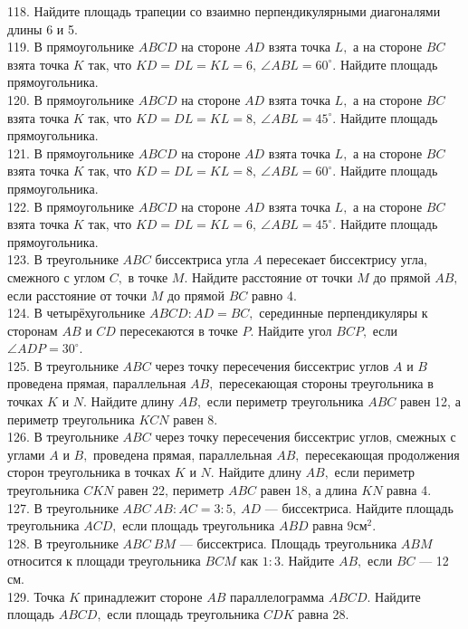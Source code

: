 \documentclass[12pt]{article}
\begin{document}
118. Найдите площадь трапеции со взаимно перпендикулярными диагоналями длины 6 и 5.\\
119. В прямоугольнике $ABCD$ на стороне $AD$ взята точка $L,$ а на стороне $BC$ взята точка $K$ так, что $KD=DL=KL=6,\ \angle ABL=60^\circ.$ Найдите площадь прямоугольника.\\
120. В прямоугольнике $ABCD$ на стороне $AD$ взята точка $L,$ а на стороне $BC$ взята точка $K$ так, что $KD=DL=KL=8,\ \angle ABL=45^\circ.$ Найдите площадь прямоугольника.\\
121. В прямоугольнике $ABCD$ на стороне $AD$ взята точка $L,$ а на стороне $BC$ взята точка $K$ так, что $KD=DL=KL=8,\ \angle ABL=60^\circ.$ Найдите площадь прямоугольника.\\
122. В прямоугольнике $ABCD$ на стороне $AD$ взята точка $L,$ а на стороне $BC$ взята точка $K$ так, что $KD=DL=KL=6,\ \angle ABL=45^\circ.$ Найдите площадь прямоугольника.\\
123. В треугольнике $ABC$ биссектриса угла $A$ пересекает биссектрису угла, смежного с углом $C,$ в точке $M.$ Найдите расстояние от точки $M$ до прямой $AB,$ если расстояние от точки $M$ до прямой $BC$ равно 4.\\
124. В четырёхугольнике $ABCD: AD=BC,$ серединные перпендикуляры к сторонам $AB$ и $CD$ пересекаются в точке $P.$ Найдите угол $BCP,$ если $\angle ADP=30^\circ.$\\
125. В треугольнике $ABC$ через точку пересечения биссектрис углов $A$ и $B$ проведена прямая, параллельная $AB,$ пересекающая стороны треугольника в точках $K$ и $N.$ Найдите длину $AB,$ если периметр треугольника $ABC$ равен 12, а периметр треугольника $KCN$ равен 8.\\
126. В треугольнике $ABC$ через точку пересечения биссектрис углов, смежных с углами $A$ и $B,$ проведена прямая, параллельная $AB,$ пересекающая продолжения сторон треугольника в точках $K$ и $N.$ Найдите длину $AB,$ если периметр треугольника $CKN$ равен 22, периметр $ABC$ равен 18, а длина $KN$ равна 4.\\
127. В треугольнике $ABC\ AB:AC=3:5,\ AD$ --- биссектриса. Найдите площадь треугольника $ACD,$ если площадь треугольника $ABD$ равна $9\text{см}^2.$\\  128. В треугольнике $ABC\ BM$ --- биссектриса. Площадь треугольника $ABM$ относится к площади треугольника $BCM$ как $1:3.$ Найдите $AB,$ если $BC$ --- 12 см.\\
129. Точка $K$ принадлежит стороне $AB$ параллелограмма $ABCD.$ Найдите площадь $ABCD,$ если площадь треугольника $CDK$ равна 28.\\
\end{document}
